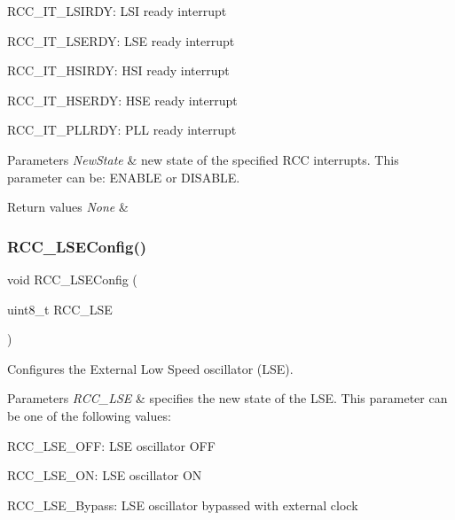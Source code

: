 \begin{DoxyItemize}
\item R\+C\+C\+\_\+\+I\+T\+\_\+\+L\+S\+I\+R\+DY\+: L\+SI ready interrupt \item R\+C\+C\+\_\+\+I\+T\+\_\+\+L\+S\+E\+R\+DY\+: L\+SE ready interrupt \item R\+C\+C\+\_\+\+I\+T\+\_\+\+H\+S\+I\+R\+DY\+: H\+SI ready interrupt \item R\+C\+C\+\_\+\+I\+T\+\_\+\+H\+S\+E\+R\+DY\+: H\+SE ready interrupt \item R\+C\+C\+\_\+\+I\+T\+\_\+\+P\+L\+L\+R\+DY\+: P\+LL ready interrupt\end{DoxyItemize}

\begin{DoxyParams}{Parameters}
{\em New\+State} & new state of the specified R\+CC interrupts. This parameter can be\+: E\+N\+A\+B\+LE or D\+I\+S\+A\+B\+LE. \\
\hline
\end{DoxyParams}

\begin{DoxyRetVals}{Return values}
{\em None} & \\
\hline
\end{DoxyRetVals}
\mbox{\label{group___r_c_c___private___functions_ga65209ab5c3589b249c7d70f978735ca6}} 
\subsubsection{\texorpdfstring{RCC\_LSEConfig()}{RCC\_LSEConfig()}}
{\footnotesize\ttfamily void R\+C\+C\+\_\+\+L\+S\+E\+Config (\begin{DoxyParamCaption}\item[{uint8\+\_\+t}]{R\+C\+C\+\_\+\+L\+SE }\end{DoxyParamCaption})}



Configures the External Low Speed oscillator (L\+SE). 


\begin{DoxyParams}{Parameters}
{\em R\+C\+C\+\_\+\+L\+SE} & specifies the new state of the L\+SE. This parameter can be one of the following values\+: \begin{DoxyItemize}
\item R\+C\+C\+\_\+\+L\+S\+E\+\_\+\+O\+FF\+: L\+SE oscillator O\+FF \item R\+C\+C\+\_\+\+L\+S\+E\+\_\+\+ON\+: L\+SE oscillator ON \item R\+C\+C\+\_\+\+L\+S\+E\+\_\+\+Bypass\+: L\+SE oscillator bypassed with external clock \end{DoxyItemize}
\\
\hline
\end{DoxyParams}

